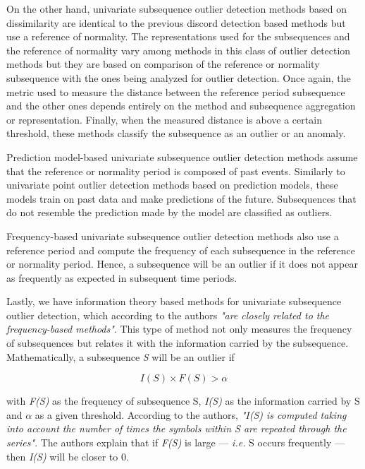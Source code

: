 On the other hand, univariate subsequence outlier detection methods based on dissimilarity are identical to the previous discord detection based methods but use a reference of normality. The representations used for the subsequences and the reference of normality vary among methods in this class of outlier detection methods but they are based on comparison of the reference or normality subsequence with the ones being analyzed for outlier detection. Once again, the metric used to measure the distance between the reference period subsequence and the other ones depends entirely on the method and subsequence aggregation or representation. Finally, when the measured distance is above a certain threshold, these methods classify the subsequence as an outlier or an anomaly.

Prediction model-based univariate subsequence outlier detection methods assume that the reference or normality period is composed of past events. Similarly to univariate point outlier detection methods based on prediction models, these models train on past data and make predictions of the future. Subsequences that do not resemble the prediction made by the model are classified as outliers.

Frequency-based univariate subsequence outlier detection methods also use a reference period and compute the frequency of each subsequence in the reference or normality period. Hence, a subsequence will be an outlier if it does not appear as frequently as expected in subsequent time periods.

Lastly, we have information theory based methods for univariate subsequence outlier detection, which according to the authors \textit{"are closely related to the frequency-based methods"}. This type of method not only measures the frequency of subsequences but relates it with the information carried by the subsequence. Mathematically, a subsequence \textit{S} will be an outlier if

\begin{equation*}
    I(S) \times F(S) > \alpha
\end{equation*}

with \textit{F(S)} as the frequency of subsequence S, \textit{I(S)} as the information carried by S and $\alpha$ as a given threshold. According to the authors, \textit{"I(S) is computed taking into account the number of times the symbols within S are repeated through the series"}. The authors explain that if \textit{F(S)} is large --- \textit{i.e.} S occurs frequently --- then \textit{I(S)} will be closer to 0.

